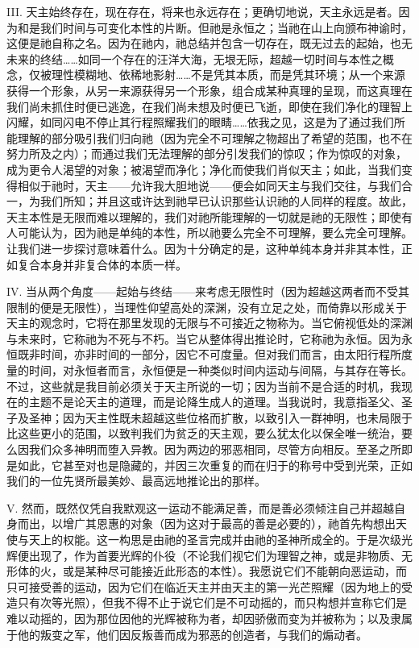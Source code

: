 III. 天主始终存在，现在存在，将来也永远存在；更确切地说，天主永远是者。因为和是我们时间与可变化本性的片断。但祂是永恒之；当祂在山上向颁布神谕时，这便是祂自称之名。因为在祂内，祂总结并包含一切存在，既无过去的起始，也无未来的终结……如同一个存在的汪洋大海，无垠无际，超越一切时间与本性之概念，仅被理性模糊地、依稀地影射……不是凭其本质，而是凭其环境；从一个来源获得一个形象，从另一来源获得另一个形象，组合成某种真理的呈现，而这真理在我们尚未抓住时便已逃逸，在我们尚未想及时便已飞逝，即使在我们净化的理智上闪耀，如同闪电不停止其行程照耀我们的眼睛……依我之见，这是为了通过我们所能理解的部分吸引我们归向祂（因为完全不可理解之物超出了希望的范围，也不在努力所及之内）；而通过我们无法理解的部分引发我们的惊叹；作为惊叹的对象，成为更令人渴望的对象；被渴望而净化；净化而使我们肖似天主；如此，当我们变得相似于祂时，天主——允许我大胆地说——便会如同天主与我们交往，与我们合一，为我们所知；并且这或许达到祂早已认识那些认识祂的人同样的程度。故此，天主本性是无限而难以理解的，我们对祂所能理解的一切就是祂的无限性；即使有人可能认为，因为祂是单纯的本性，所以祂要么完全不可理解，要么完全可理解。让我们进一步探讨意味着什么。因为十分确定的是，这种单纯本身并非其本性，正如复合本身并非复合体的本质一样。\par

IV. 当从两个角度——起始与终结——来考虑无限性时（因为超越这两者而不受其限制的便是无限性），当理性仰望高处的深渊，没有立足之处，而倚靠以形成关于天主的观念时，它将在那里发现的无限与不可接近之物称为。当它俯视低处的深渊与未来时，它称祂为不死与不朽。当它从整体得出推论时，它称祂为永恒。因为永恒既非时间，亦非时间的一部分，因它不可度量。但对我们而言，由太阳行程所度量的时间，对永恒者而言，永恒便是一种类似时间内运动与间隔，与其存在等长。不过，这些就是我目前必须关于天主所说的一切；因为当前不是合适的时机，我现在的主题不是论天主的道理，而是论降生成人的道理。当我说时，我意指圣父、圣子及圣神；因为天主性既未超越这些位格而扩散，以致引入一群神明，也未局限于比这些更小的范围，以致判我们为贫乏的天主观，要么犹太化以保全唯一统治，要么因我们众多神明而堕入异教。因为两边的邪恶相同，尽管方向相反。至圣之所即是如此，它甚至对也是隐藏的，并因三次重复的而在归于的称号中受到光荣，正如我们的一位先贤所最美妙、最高远地推论出的那样。\par

V. 然而，既然仅凭自我默观这一运动不能满足善，而是善必须倾注自己并超越自身而出，以增广其恩惠的对象（因为这对于最高的善是必要的），祂首先构想出天使与天上的权能。这一构思是由祂的圣言完成并由祂的圣神所成全的。于是次级光辉便出现了，作为首要光辉的仆役（不论我们视它们为理智之神，或是非物质、无形体的火，或是某种尽可能接近此形态的本性）。我愿说它们不能朝向恶运动，而只可接受善的运动，因为它们在临近天主并由天主的第一光芒照耀（因为地上的受造只有次等光照），但我不得不止于说它们是不可动摇的，而只构想并宣称它们是难以动摇的，因为那位因他的光辉被称为者，却因骄傲而变为并被称为；以及隶属于他的叛变之军，他们因反叛善而成为邪恶的创造者，与我们的煽动者。\par

